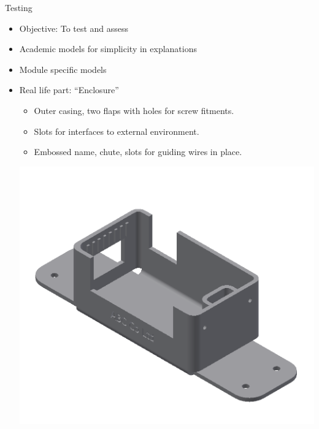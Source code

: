 
\begin{frame}{Testing}
\begin{itemize}[noitemsep,label=\textbullet,topsep=2pt,parsep=2pt,partopsep=2pt]
\item Objective: To test and assess 
\item Academic models for simplicity in explanations
\item Module specific models
\item Real life part: ``Enclosure''
	\begin{itemize}[noitemsep,label=\textbullet,topsep=2pt,parsep=2pt,partopsep=2pt]
	\item Outer casing, two flaps with holes for screw fitments. 
	\item Slots for interfaces to external environment. 
	\item Embossed name, chute, slots for guiding wires in place. 
	\end{itemize}
\vspace{-.25cm}
\includegraphics[width=0.45\linewidth]{../Common/images/SheetMetal_Medium_Enclosure_OriginalPart}
\end{itemize}


\end{frame}



